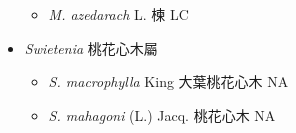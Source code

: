 \begin{itemize}
  \begin{itemize}
        \item[] \textit{M. azedarach} L.  楝   LC
  \end{itemize}
 \item[] \textit{Swietenia} 桃花心木屬
                                
  \begin{itemize}
        \item[] \textit{S. macrophylla} King  大葉桃花心木   NA
        \item[] \textit{S. mahagoni} (L.) Jacq.  桃花心木   NA
  \end{itemize}
  \end{itemize}
